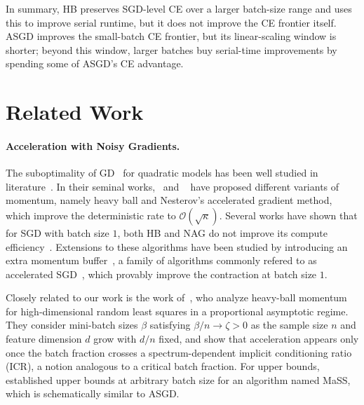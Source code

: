 \documentclass{article}
\newcommand{\bigO}{\mathcal{O}}
\begin{document}
In summary, HB preserves SGD-level CE over a larger batch-size range and uses
this to improve serial runtime, but it does not improve the CE frontier itself.
ASGD improves the small-batch CE frontier, but its linear-scaling window is
shorter; beyond this window, larger batches buy serial-time improvements by
spending some of ASGD's CE advantage.

\section{Related Work}
\label{sec:related_work}
\paragraph{Acceleration with Noisy Gradients.} The suboptimality of GD~\citep{cauchy1847methode} for quadratic models has been well studied in literature~\citep{nesterov2013introductory}. In their seminal works,~\citet{polyak1964some} and ~\citet{nesterov1983method} have proposed different variants of momentum, namely heavy ball and Nesterov's accelerated gradient method, which improve the deterministic rate to $\bigO(\sqrt{\kappa})$. Several works have shown that for SGD with batch size $1$, both HB and NAG do not improve its compute efficiency~\citep{jain2018accelerating,kidambi2018insufficiency}. Extensions to these algorithms have been studied by introducing an extra momentum buffer~\citep{kidambi2018insufficiency,jain2018accelerating,gupta2024nesterov}, a family of algorithms commonly refered to as accelerated SGD~\citep{morwani2025connections,ferbach2025dimension}, which provably improve the contraction at batch size $1$. 

Closely related to our work is the work of~\citet{lee2022trajectory},
who analyze heavy-ball momentum for high-dimensional random least squares
in a proportional asymptotic regime. They consider mini-batch sizes
$\beta$ satisfying $\beta/n \to \zeta>0$ as the sample size $n$ and
feature dimension $d$ grow with $d/n$ fixed, and show that acceleration
appears only once the batch fraction crosses a spectrum-dependent
implicit conditioning ratio (ICR), a notion analogous to a critical batch
fraction. For upper bounds,~\citet{liu2018accelerating} established upper bounds at arbitrary batch size for an algorithm named MaSS, which is schematically similar to ASGD. 
\end{document}
